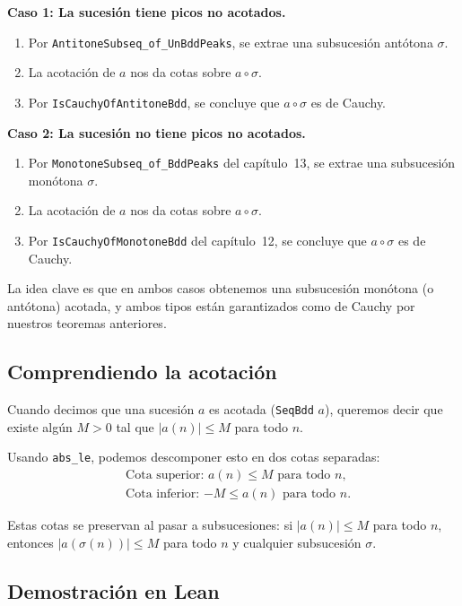 \medskip
\noindent\textbf{Caso 1: La sucesión tiene picos no acotados.}
\begin{enumerate}
  \item Por \texttt{AntitoneSubseq\_of\_UnBddPeaks}, se extrae una
        subsucesión antótona $\sigma$.
  \item La acotación de $a$ nos da cotas sobre $a \circ \sigma$.
  \item Por \texttt{IsCauchyOfAntitoneBdd}, se concluye que
        $a \circ \sigma$ es de Cauchy.
\end{enumerate}

\medskip
\noindent\textbf{Caso 2: La sucesión no tiene picos no acotados.}
\begin{enumerate}
  \item Por \texttt{MonotoneSubseq\_of\_BddPeaks} del capítulo~13,
        se extrae una subsucesión monótona $\sigma$.
  \item La acotación de $a$ nos da cotas sobre $a \circ \sigma$.
  \item Por \texttt{IsCauchyOfMonotoneBdd} del capítulo~12, se
        concluye que $a \circ \sigma$ es de Cauchy.
\end{enumerate}

La idea clave es que en ambos casos obtenemos una subsucesión monótona
(o antótona) acotada, y ambos tipos están garantizados como de Cauchy
por nuestros teoremas anteriores.

\subsection{Comprendiendo la acotación}

Cuando decimos que una sucesión $a$ es acotada (\texttt{SeqBdd} $a$),
queremos decir que existe algún $M > 0$ tal que $|a(n)| \leq M$ para
todo $n$.

Usando \texttt{abs\_le}, podemos descomponer esto en dos cotas
separadas:
\begin{align*}
  &\text{Cota superior: } a(n) \leq M \text{ para todo } n,\\
  &\text{Cota inferior: } {-M} \leq a(n) \text{ para todo } n.
\end{align*}

Estas cotas se preservan al pasar a subsucesiones: si $|a(n)| \leq M$
para todo $n$, entonces $|a(\sigma(n))| \leq M$ para todo $n$ y
cualquier subsucesión $\sigma$.

\subsection{Demostración en Lean}

